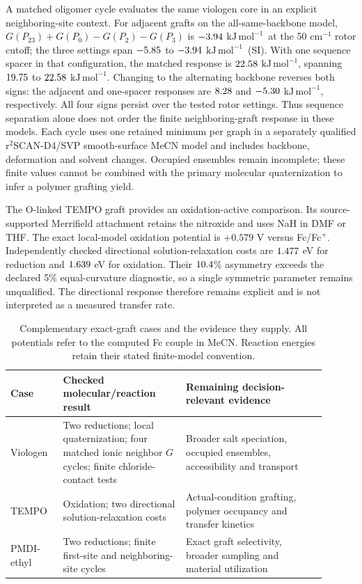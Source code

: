 \documentclass[11pt]{article}
\newcommand{\kj}{\ensuremath{\mathrm{kJ\,mol^{-1}}}}
\begin{document}
A matched oligomer cycle evaluates the same viologen core in an explicit neighboring-site context. For adjacent grafts on the all-same-backbone model, $G(P_{23})+G(P_0)-G(P_2)-G(P_3)$ is $-3.94$ \kj\ at the 50 cm$^{-1}$ rotor cutoff; the three settings span $-5.85$ to $-3.94$ \kj\ (SI). With one sequence spacer in that configuration, the matched response is $22.58$ \kj, spanning $19.75$ to $22.58$ \kj. Changing to the alternating backbone reverses both signs: the adjacent and one-spacer responses are $8.28$ and $-5.30$ \kj, respectively. All four signs persist over the tested rotor settings. Thus sequence separation alone does not order the finite neighboring-graft response in these models. Each cycle uses one retained minimum per graph in a separately qualified r$^2$SCAN-D4/SVP smooth-surface MeCN model and includes backbone, deformation and solvent changes. Occupied ensembles remain incomplete; these finite values cannot be combined with the primary molecular quaternization to infer a polymer grafting yield.

The O-linked TEMPO graft provides an oxidation-active comparison. Its source-supported Merrifield attachment retains the nitroxide and uses NaH in DMF or THF.\cite{sommerlade2002tempo} The exact local-model oxidation potential is $+0.579$ V versus Fc/Fc$^+$. Independently checked directional solution-relaxation costs are $1.477$ eV for reduction and $1.639$ eV for oxidation. Their $10.4$\% asymmetry exceeds the declared 5\% equal-curvature diagnostic, so a single symmetric parameter remains unqualified. The directional response therefore remains explicit and is not interpreted as a measured transfer rate.

\begin{table}[htbp]\centering\small
\caption{Complementary exact-graft cases and the evidence they supply. All potentials refer to the computed Fc couple in MeCN. Reaction energies retain their stated finite-model convention.}
\begin{tabular}{p{0.15\linewidth}p{0.35\linewidth}p{0.40\linewidth}}
\toprule
Case & Checked molecular/reaction result & Remaining decision-relevant evidence \\
\midrule
Viologen & Two reductions; local quaternization; four matched ionic neighbor $G$ cycles; finite chloride-contact tests & Broader salt speciation, occupied ensembles, accessibility and transport \\
TEMPO & Oxidation; two directional solution-relaxation costs & Actual-condition grafting, polymer occupancy and transfer kinetics \\
PMDI-ethyl & Two reductions; finite first-site and neighboring-site cycles & Exact graft selectivity, broader sampling and material utilization \\
\bottomrule
\end{tabular}
\label{tab:cases}\end{table}
\end{document}
